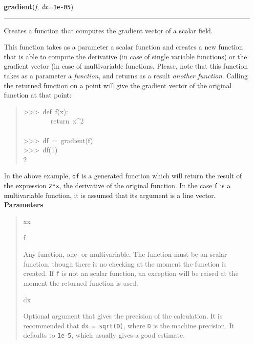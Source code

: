\hspace{.8\funcindent}\begin{boxedminipage}{\funcwidth}

    \raggedright \textbf{gradient}(\textit{f}, \textit{dx}={\tt 1e-05})

    \vspace{-1.5ex}

    \rule{\textwidth}{0.5\fboxrule}
\setlength{\parskip}{2ex}

Creates a function that computes the gradient vector of a scalar field.

This function takes as a parameter a scalar function and creates a new
function that is able to compute the derivative (in case of single variable
functions) or the gradient vector (in case of multivariable functions.
Please, note that this function takes as a parameter a \emph{function}, and
returns as a result \emph{another function}. Calling the returned function on a
point will give the gradient vector of the original function at that point:
%
\begin{quote}{\ttfamily \raggedright \noindent
>{}>{}>~def~f(x):\\
~~~~~~~~return~x\textasciicircum{}2\\
~\\
>{}>{}>~df~=~gradient(f)\\
>{}>{}>~df(1)\\
2
}
\end{quote}

In the above example, \texttt{df} is a generated function which will return the
result of the expression \texttt{2*x}, the derivative of the original function.
In the case \texttt{f} is a multivariable function, it is assumed that its
argument is a line vector.
\setlength{\parskip}{1ex}
      \textbf{Parameters}
      \vspace{-1ex}

      \begin{quote}
        \begin{Ventry}{xx}

          \item[f]


Any function, one- or multivariable. The function must be an scalar
function, though there is no checking at the moment the function is
created. If \texttt{f} is not an scalar function, an exception will be
raised at the moment the returned function is used.
          \item[dx]


Optional argument that gives the precision of the calculation. It is
recommended that \texttt{dx = sqrt(D)}, where \texttt{D} is the machine precision.
It defaults to \texttt{1e-5}, which usually gives a good estimate.
        \end{Ventry}


\end{quote}
\end{boxedminipage}
